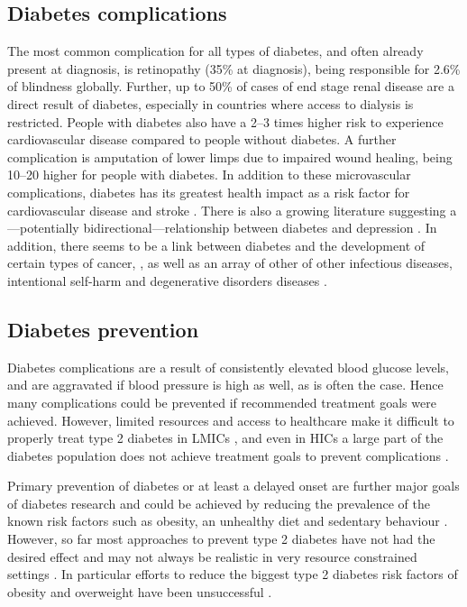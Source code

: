 \subsection{Diabetes complications}

The most common complication for all types of diabetes, and often already present at diagnosis, is retinopathy (35\% at diagnosis), being responsible for 2.6\% of blindness globally. Further, up to 50\% of cases of end stage renal disease are a direct result of diabetes, especially in countries where access to dialysis is restricted. People with diabetes also have a 2--3 times higher risk to experience cardiovascular disease compared to people without diabetes. A further complication is amputation of lower limps due to impaired wound healing, being 10--20 higher for people with diabetes. In addition to these microvascular complications, diabetes has its greatest health impact as a risk factor for cardiovascular disease and stroke \parencite{WorldHealthOrganization2016}. There is also a growing literature suggesting a---potentially bidirectional---relationship between diabetes and depression \parencite{VanDooren2013,Nouwen2010,Roy2012}. In addition, there seems to be a link between diabetes and the development of certain types of cancer, \parencite{Tsilidis2015,Nead2015}, as well as an array of other of other infectious diseases, intentional self-harm and degenerative disorders diseases \parencite{Seshasai2011}.


\subsection{Diabetes prevention}

Diabetes complications are a result of consistently elevated blood glucose levels, and  are aggravated if blood pressure is high as well, as is often the case. Hence many complications could be prevented if recommended treatment goals were achieved. However, limited resources and access to healthcare make it difficult to properly treat type 2 diabetes in \acp{LMIC} \parencite{Villalpando2010}, and even in \acp{HIC} a large part of the diabetes population does not achieve treatment goals to prevent complications \parencite{DiabetesUK2012}. 

Primary prevention of diabetes or at least a delayed onset are further major goals of diabetes research and could be achieved by reducing the prevalence of the known risk factors such as obesity, an unhealthy diet and sedentary behaviour \parencite{WorldHealthOrganization2016}. However, so far most approaches to prevent type 2 diabetes have not had the desired effect and may not always be realistic in very resource constrained settings \parencite{White2016}. In particular efforts to reduce the biggest type 2 diabetes risk factors of obesity and overweight have been unsuccessful \parencite{Roberto2015}.

